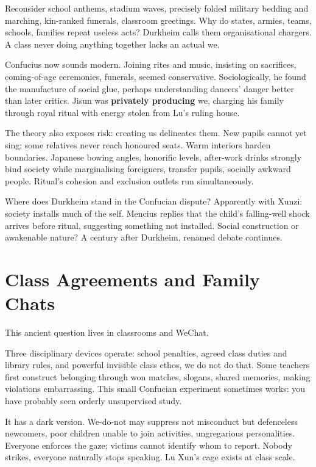 Reconsider school anthems, stadium waves, precisely folded military bedding and marching, kin-ranked funerals, classroom greetings. Why do states, armies, teams, schools, families repeat useless acts? Durkheim calls them organisational chargers. A class never doing anything together lacks an actual we.

Confucius now sounds modern. Joining rites and music, insisting on sacrifices, coming-of-age ceremonies, funerals, seemed conservative. Sociologically, he found the manufacture of social glue, perhaps understanding dancers' danger better than later critics. Jisun was \textbf{privately producing} we, charging his family through royal ritual with energy stolen from Lu's ruling house.

The theory also exposes risk: creating us delineates them. New pupils cannot yet sing; some relatives never reach honoured seats. Warm interiors harden boundaries. Japanese bowing angles, honorific levels, after-work drinks strongly bind society while marginalising foreigners, transfer pupils, socially awkward people. Ritual's cohesion and exclusion outlets run simultaneously.

Where does Durkheim stand in the Confucian dispute? Apparently with Xunzi: society installs much of the self. Mencius replies that the child's falling-well shock arrives before ritual, suggesting something not installed. Social construction or awakenable nature? A century after Durkheim, renamed debate continues.

\section{Class Agreements and Family Chats}
This ancient question lives in classrooms and WeChat.

Three disciplinary devices operate: school penalties, agreed class duties and library rules, and powerful invisible class ethos, we do not do that. Some teachers first construct belonging through won matches, slogans, shared memories, making violations embarrassing. This small Confucian experiment sometimes works: you have probably seen orderly unsupervised study.

It has a dark version. We-do-not may suppress not misconduct but defenceless newcomers, poor children unable to join activities, ungregarious personalities. Everyone enforces the gaze; victims cannot identify whom to report. Nobody strikes, everyone naturally stops speaking. Lu Xun's cage exists at class scale.

